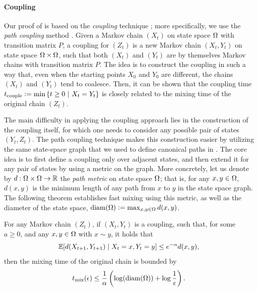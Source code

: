 \paragraph{Coupling}
Our proof of  is based on the \emph{coupling} technique \cite{aldous83}; more specifically, we use the \emph{path coupling} method \cite{bubley97,levin08,jerrum03}.
Given a Markov chain $(X_t)$ on state space $\ss$ with transition matrix $P$, a coupling for $(Z_t)$ is a new Markov chain $(X_t, Y_t)$ on state space $\ss \times \ss$, such that both $(X_t)$ and $(Y_t)$ are by themselves Markov chains with transition matrix $P$.
The idea is to construct the coupling in such a way that, even when the starting points $X_0$ and $Y_0$ are different, the chains $(X_t)$ and $(Y_t)$ tend to coalesce.
Then, it can be shown that the coupling time $t_{\mathrm{couple}} \defeq \min\sdef{t \geq 0}{X_t = Y_t}$ is closely related to the mixing time of the original chain $(Z_t)$. \cite{levin08}

The main difficulty in applying the coupling approach lies in the construction of the coupling itself, for which one needs to consider any possible pair of states $(Y_t, Z_t)$.
The path coupling technique makes this construction easier by utilizing the same state-space graph that we used to define canonical paths in .
The core idea is to first define a coupling only over adjacent states, and then extend it for any pair of states by using a metric on the graph.
More concretely, let us denote by $d : \ss \times \ss \to \mathbb{R}$ the \emph{path metric} on state space $\ss$; that is, for any $x, y \in \ss$, $d(x, y)$ is the minimum length of any path from $x$ to $y$ in the state space graph.
The following theorem establishes fast mixing using this metric, as well as the diameter of the state space, $\mathrm{diam}(\ss) \defeq \max_{x,y \in \ss}d(x, y)$.
\begin{theorem} \label{thm:pc}
For any Markov chain $(Z_t)$, if $(X_t, Y_t)$ is a coupling, such that, for some $a \geq 0$, and any $x, y \in \ss$ with $x \sim y$, it holds that
\begin{align*}
  \E[d(X_{t+1}, Y_{t+1}) \mid X_t = x, Y_t = y] \leq e^{-\alpha}d(x, y),
\end{align*}
then the mixing time of the original chain is bounded by
\begin{align*}
  \tme \leq \frac{1}{\alpha}\left(\log(\mathrm{diam}(\ss)) + \log\frac{1}{\epsilon} \right).
\end{align*}
\end{theorem}

